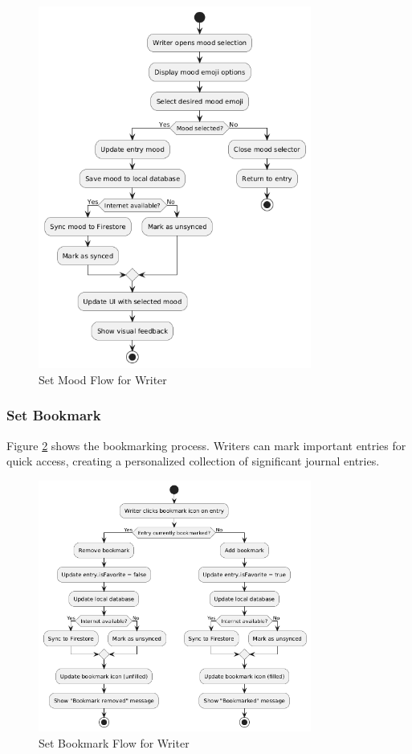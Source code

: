 \begin{figure}[H]
\centering
\includegraphics[width=0.8\textwidth]{files/imgs/set_mood_flow.png}
\caption{Set Mood Flow for Writer}
\label{fig:set-mood-flow}
\end{figure}

\subsubsection{Set Bookmark}\label{subsubsec:setBookmark}

Figure \ref{fig:set-bookmark-flow} shows the bookmarking process. Writers can mark important entries for quick access, creating a personalized collection of significant journal entries.

\begin{figure}[H]
\centering
\includegraphics[width=0.8\textwidth]{files/imgs/set_bookmark_flow.png}
\caption{Set Bookmark Flow for Writer}
\label{fig:set-bookmark-flow}
\end{figure}

